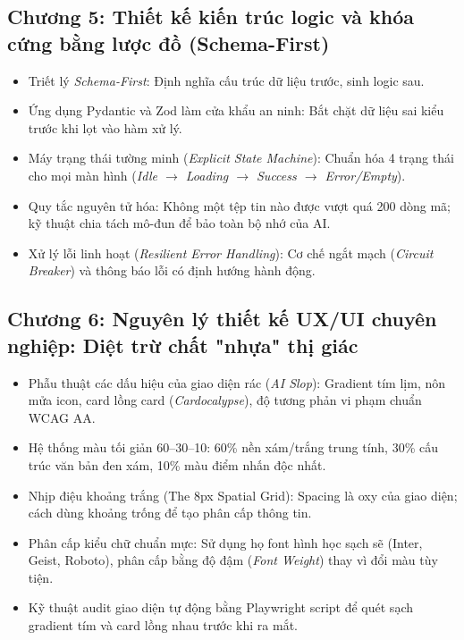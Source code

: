 \documentclass[a4paper,11pt]{article}
\begin{document}
\subsection{Chương 5: Thiết kế kiến trúc logic và khóa cứng bằng lược đồ (Schema-First)}
\begin{itemize}[leftmargin=1.5em]
    \item Triết lý \textit{Schema-First}: Định nghĩa cấu trúc dữ liệu trước, sinh logic sau.
    \item Ứng dụng Pydantic và Zod làm cửa khẩu an ninh: Bắt chặt dữ liệu sai kiểu trước khi lọt vào hàm xử lý.
    \item Máy trạng thái tường minh (\textit{Explicit State Machine}): Chuẩn hóa 4 trạng thái cho mọi màn hình (\textit{Idle $\to$ Loading $\to$ Success $\to$ Error/Empty}).
    \item Quy tắc nguyên tử hóa: Không một tệp tin nào được vượt quá 200 dòng mã; kỹ thuật chia tách mô-đun để bảo toàn bộ nhớ của AI.
    \item Xử lý lỗi linh hoạt (\textit{Resilient Error Handling}): Cơ chế ngắt mạch (\textit{Circuit Breaker}) và thông báo lỗi có định hướng hành động.
\end{itemize}

\subsection{Chương 6: Nguyên lý thiết kế UX/UI chuyên nghiệp: Diệt trừ chất "nhựa" thị giác}
\begin{itemize}[leftmargin=1.5em]
    \item Phẫu thuật các dấu hiệu của giao diện rác (\textit{AI Slop}): Gradient tím lịm, nôn mửa icon, card lồng card (\textit{Cardocalypse}), độ tương phản vi phạm chuẩn WCAG AA.
    \item Hệ thống màu tối giản 60--30--10: 60\% nền xám/trắng trung tính, 30\% cấu trúc văn bản đen xám, 10\% màu điểm nhấn độc nhất.
    \item Nhịp điệu khoảng trắng (The 8px Spatial Grid): Spacing là oxy của giao diện; cách dùng khoảng trống để tạo phân cấp thông tin.
    \item Phân cấp kiểu chữ chuẩn mực: Sử dụng họ font hình học sạch sẽ (Inter, Geist, Roboto), phân cấp bằng độ đậm (\textit{Font Weight}) thay vì đổi màu tùy tiện.
    \item Kỹ thuật audit giao diện tự động bằng Playwright script để quét sạch gradient tím và card lồng nhau trước khi ra mắt.
\end{itemize}
\end{document}
